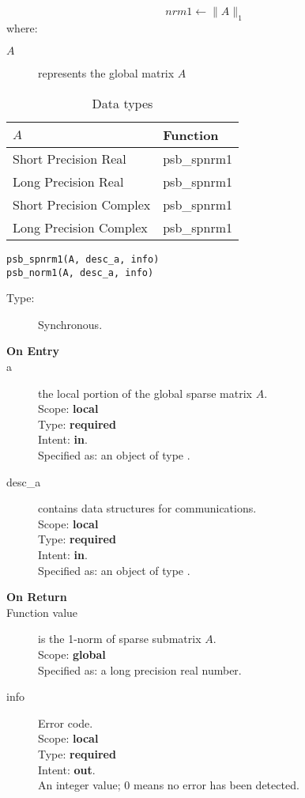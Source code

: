 \[ nrm1 \leftarrow \|A\|_1 \]
where:
\begin{description}
\item[$A$] represents the global matrix $A$
\end{description}

\begin{table}[h]
\begin{center}
\begin{tabular}{ll}
\hline
$A$ & {\bf Function}\\
\hline
Short Precision Real & psb\_spnrm1 \\
Long Precision Real & psb\_spnrm1 \\
Short Precision Complex & psb\_spnrm1 \\
Long Precision Complex & psb\_spnrm1 \\
\hline
\end{tabular}
\end{center}
\caption{Data types\label{tab:f90nrm1}}
\end{table}

\begin{verbatim}
psb_spnrm1(A, desc_a, info)
psb_norm1(A, desc_a, info)
\end{verbatim}

\begin{description}
\item[Type:] Synchronous.
\item[\bf On Entry]
\item[a] the local  portion of the global sparse matrix
$A$. \\
Scope: {\bf local} \\
Type: {\bf required}\\
Intent: {\bf in}.\\
Specified as: an object of type \spdata.
\item[desc\_a] contains data structures for communications.\\
Scope: {\bf local} \\
Type: {\bf required}\\
Intent: {\bf in}.\\
Specified as: an object of type \descdata.
\item[\bf On Return]
\item[Function value] is the 1-norm of sparse submatrix $A$.\\
Scope: {\bf global} \\
Specified as: a long precision real number.
\item[info] Error code.\\
Scope: {\bf local} \\
Type: {\bf required} \\
Intent: {\bf out}.\\
An integer value; 0 means no error has been detected.
\end{description}


